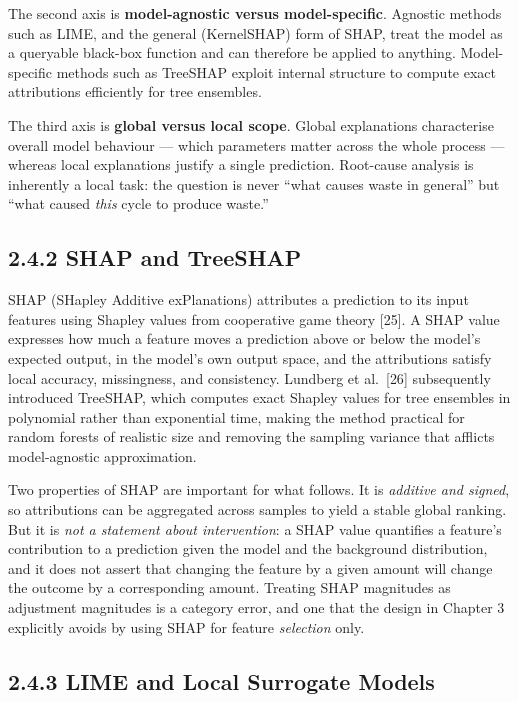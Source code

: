 The second axis is \textbf{model-agnostic versus model-specific}. Agnostic methods such as LIME, and the general (KernelSHAP) form of SHAP, treat the model as a queryable black-box function and can therefore be applied to anything. Model-specific methods such as TreeSHAP exploit internal structure to compute exact attributions efficiently for tree ensembles.

The third axis is \textbf{global versus local scope}. Global explanations characterise overall model behaviour --- which parameters matter across the whole process --- whereas local explanations justify a single prediction. Root-cause analysis is inherently a local task: the question is never ``what causes waste in general'' but ``what caused \emph{this} cycle to produce waste.''

\hypertarget{shap-and-treeshap}{%
\subsection{2.4.2 SHAP and TreeSHAP}\label{shap-and-treeshap}}

SHAP (SHapley Additive exPlanations) attributes a prediction to its input features using Shapley values from cooperative game theory {[}25{]}. A SHAP value expresses how much a feature moves a prediction above or below the model's expected output, in the model's own output space, and the attributions satisfy local accuracy, missingness, and consistency. Lundberg et al.~{[}26{]} subsequently introduced TreeSHAP, which computes exact Shapley values for tree ensembles in polynomial rather than exponential time, making the method practical for random forests of realistic size and removing the sampling variance that afflicts model-agnostic approximation.

Two properties of SHAP are important for what follows. It is \emph{additive and signed}, so attributions can be aggregated across samples to yield a stable global ranking. But it is \emph{not a statement about intervention}: a SHAP value quantifies a feature's contribution to a prediction given the model and the background distribution, and it does not assert that changing the feature by a given amount will change the outcome by a corresponding amount. Treating SHAP magnitudes as adjustment magnitudes is a category error, and one that the design in Chapter 3 explicitly avoids by using SHAP for feature \emph{selection} only.

\hypertarget{lime-and-local-surrogate-models}{%
\subsection{2.4.3 LIME and Local Surrogate Models}\label{lime-and-local-surrogate-models}}

